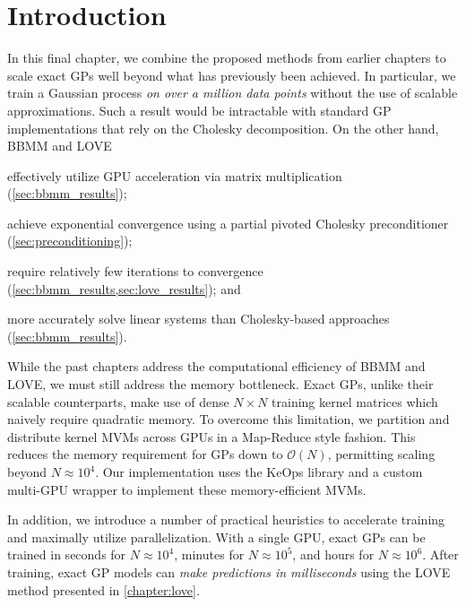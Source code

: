 \section{Introduction}


In this final chapter, we combine the proposed methods from earlier chapters to scale exact GPs well beyond what has previously been achieved.
In particular, we train a Gaussian process \emph{on over a million data points} without the use of scalable approximations.
Such a result would be intractable with standard GP implementations that rely on the Cholesky decomposition.
On the other hand, BBMM and LOVE
\begin{enumerate*}
  \item effectively utilize GPU acceleration via matrix multiplication (\cref{sec:bbmm_results});
  \item achieve exponential convergence using a partial pivoted Cholesky preconditioner (\cref{sec:preconditioning});
  \item require relatively few iterations to convergence (\cref{sec:bbmm_results,sec:love_results}); and
  \item more accurately solve linear systems than Cholesky-based approaches (\cref{sec:bbmm_results}).
\end{enumerate*}

While the past chapters address the computational efficiency of BBMM and LOVE, we must still address the memory bottleneck.
Exact GPs, unlike their scalable counterparts, make use of dense $N \times N$ training kernel matrices which naively require quadratic memory.
To overcome this limitation, we partition and distribute kernel MVMs across GPUs in a Map-Reduce style fashion.
This reduces the memory requirement for GPs down to $\mathcal{O}(N)$, permitting scaling beyond $N\approx 10^4$.
Our implementation uses the KeOps library \cite{charlier2020kernel} and a custom multi-GPU wrapper to implement these memory-efficient MVMs.

In addition, we introduce a number of practical heuristics to accelerate training and maximally utilize parallelization.
With a single GPU, exact GPs can be trained in seconds for $N \approx 10^4$, minutes for $N \approx 10^5$, and hours for $N \approx 10^6$.
After training, exact GP models can \emph{make predictions in milliseconds} using the LOVE method presented in \cref{chapter:love}.




